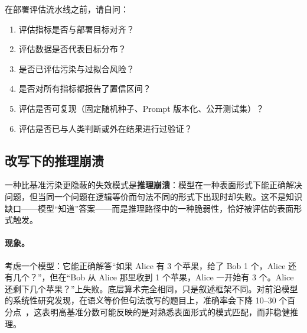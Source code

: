 \begin{questionbox}[评估设计的关键问题]
在部署评估流水线之前，请自问：

\begin{enumerate}
  \item 评估指标是否与部署目标对齐？
  \item 评估数据是否代表目标分布？
  \item 是否已评估污染与过拟合风险？
  \item 是否对所有指标都报告了置信区间？
  \item 评估是否可复现（固定随机种子、Prompt 版本化、公开测试集）？
  \item 评估是否已与人类判断或外在结果进行过验证？
\end{enumerate}
\end{questionbox}

\subsection{改写下的推理崩溃}
\label{subsec:reasoning-collapse}

一种比基准污染更隐蔽的失效模式是\textbf{推理崩溃}：模型在一种表面形式下能正确解决问题，但当同一个问题在逻辑等价而句法不同的形式下出现时却失败。这不是知识缺口——模型“知道”答案——而是推理路径中的一种脆弱性，恰好被评估的表面形式触发。

\paragraph{现象。}
考虑一个模型：它能正确解答“如果 Alice 有 3 个苹果，给了 Bob 1 个，Alice 还有几个？”，但在“Bob 从 Alice 那里收到 1 个苹果，Alice 一开始有 3 个。Alice 还剩下几个苹果？”上失败。底层算术完全相同，只是叙述框架不同。对前沿模型的系统性研究发现，在语义等价但句法改写的题目上，准确率会下降 10--30 个百分点~\cite{mizrahi2024state}，这表明高基准分数可能反映的是对熟悉表面形式的模式匹配，而非稳健推理。

